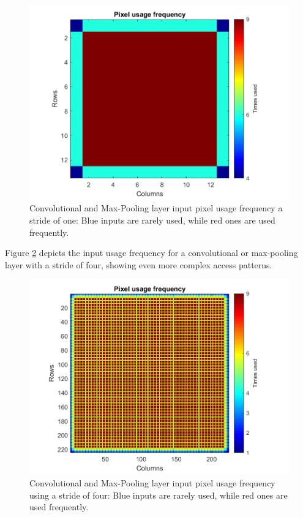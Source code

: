 \begin{figure} [H]
	\centering
	\includegraphics[width=\textwidth]{../Images/Scheduling/Conv5-pixel-frequency.png}
	\decoRule
	\caption[Convolutional and Max-Pooling layer input pixel usage frequency using a stride of one]{Convolutional and Max-Pooling layer input pixel usage frequency a stride of one: Blue inputs are rarely used, while red ones are used frequently.}
	\label{fig:Conv5-pixel-frequency}
\end{figure}

Figure \ref{fig:Conv1-pixel-frequency} depicts the input usage frequency for a convolutional or max-pooling layer with a stride of four, showing even more complex access patterns.

\begin{figure} [H]
	\centering
	\includegraphics[width=\textwidth]{../Images/Scheduling/Conv1-pixel-frequency.png}
	\decoRule
	\caption[Convolutional and Max-Pooling layer input pixel usage frequency using a stride of four]{Convolutional and Max-Pooling layer input pixel usage frequency using a stride of four: Blue inputs are rarely used, while red ones are used frequently.}
	\label{fig:Conv1-pixel-frequency}
\end{figure}

